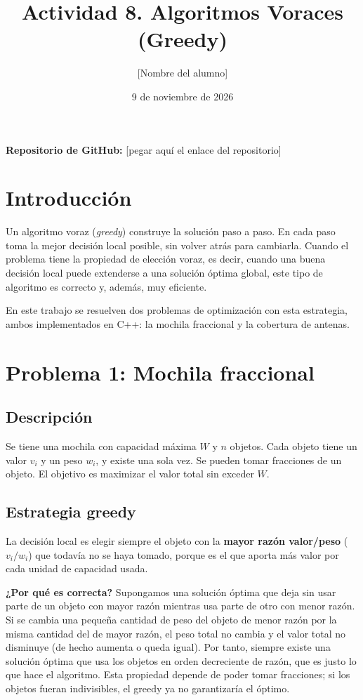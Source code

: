 \documentclass[11pt,a4paper]{article}
\title{Actividad 8. Algoritmos Voraces (Greedy)}
\author{[Nombre del alumno]}
\date{9 de noviembre de 2026}
\begin{document}
\maketitle

\noindent\textbf{Repositorio de GitHub:} [pegar aquí el enlace del repositorio]

\section{Introducción}

Un algoritmo voraz (\textit{greedy}) construye la solución paso a paso. En cada paso toma la mejor decisión local posible, sin volver atrás para cambiarla. Cuando el problema tiene la propiedad de elección voraz, es decir, cuando una buena decisión local puede extenderse a una solución óptima global, este tipo de algoritmo es correcto y, además, muy eficiente.

En este trabajo se resuelven dos problemas de optimización con esta estrategia, ambos implementados en C++: la mochila fraccional y la cobertura de antenas.

\section{Problema 1: Mochila fraccional}

\subsection{Descripción}

Se tiene una mochila con capacidad máxima $W$ y $n$ objetos. Cada objeto tiene un valor $v_i$ y un peso $w_i$, y existe una sola vez. Se pueden tomar fracciones de un objeto. El objetivo es maximizar el valor total sin exceder $W$.

\subsection{Estrategia greedy}

La decisión local es elegir siempre el objeto con la \textbf{mayor razón valor/peso} ($v_i / w_i$) que todavía no se haya tomado, porque es el que aporta más valor por cada unidad de capacidad usada.

\textbf{¿Por qué es correcta?} Supongamos una solución óptima que deja sin usar parte de un objeto con mayor razón mientras usa parte de otro con menor razón. Si se cambia una pequeña cantidad de peso del objeto de menor razón por la misma cantidad del de mayor razón, el peso total no cambia y el valor total no disminuye (de hecho aumenta o queda igual). Por tanto, siempre existe una solución óptima que usa los objetos en orden decreciente de razón, que es justo lo que hace el algoritmo. Esta propiedad depende de poder tomar fracciones; si los objetos fueran indivisibles, el greedy ya no garantizaría el óptimo.
\end{document}
